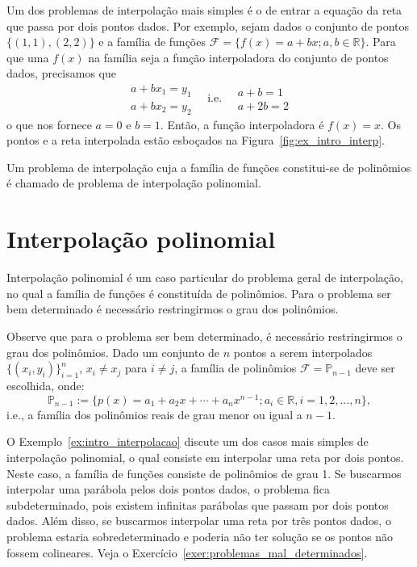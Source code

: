 \begin{ex}\label{ex:intro_interpolacao}
  Um dos problemas de interpolação mais simples é o de entrar a equação da reta que passa por dois pontos dados. Por exemplo, sejam dados o conjunto de pontos $\{(1, 1), (2, 2)\}$ e a família de funções $\mathcal{F} = \{f(x) = a + bx; a,b\in\mathbb{R}\}$. Para que uma $f(x)$ na família seja a função interpoladora do conjunto de pontos dados, precisamos que
  \begin{equation*}
    \begin{array}{l}
      a + bx_1 = y_1\\
      a + bx_2 = y_2
    \end{array}\quad\text{i.e.}\quad
    \begin{array}{l}
      a + b = 1\\
      a + 2b = 2
    \end{array}
  \end{equation*}
o que nos fornece $a = 0$ e $b = 1$. Então, a função interpoladora é $f(x) = x$. Os pontos e a reta interpolada estão esboçados na Figura~\ref{fig:ex_intro_interp}.
\end{ex}

Um problema de interpolação cuja a família de funções constitui-se de polinômios é chamado de problema de interpolação polinomial.

\section{Interpolação polinomial}

Interpolação polinomial é um caso particular do problema geral de interpolação, no qual a família de funções é constituída de polinômios. Para o problema ser bem determinado é necessário restringirmos o grau dos polinômios. 

Observe que para o problema ser bem determinado, é necessário restringirmos o grau dos polinômios. Dado um conjunto de $n$ pontos a serem interpolados $\{(x_i,y_i)\}_{i=1}^{n}$, $x_i\neq x_j$ para $i\neq j$, a família de polinômios $\mathcal{F} = \mathbb{P}_{n-1}$ deve ser escolhida, onde:
\begin{equation*}
  \mathbb{P}_{n-1} := \{p(x) = a_1 + a_2x + \cdots + a_nx^{n-1}; a_i\in\mathbb{R}, i=1,2,\dotsc, n\},
\end{equation*}
i.e., a família dos polinômios reais de grau menor ou igual a $n-1$.

O Exemplo~\ref{ex:intro_interpolacao} discute um dos casos mais simples de interpolação polinomial, o qual consiste em interpolar uma reta por dois pontos. Neste caso, a família de funções consiste de polinômios de grau 1. Se buscarmos interpolar uma parábola pelos dois pontos dados, o problema fica subdeterminado, pois existem infinitas parábolas que passam por dois pontos dados. Além disso, se buscarmos interpolar uma reta por três pontos dados, o problema estaria sobredeterminado e poderia não ter solução se os pontos não fossem colineares. Veja o Exercício~\ref{exer:problemas_mal_determinados}.


